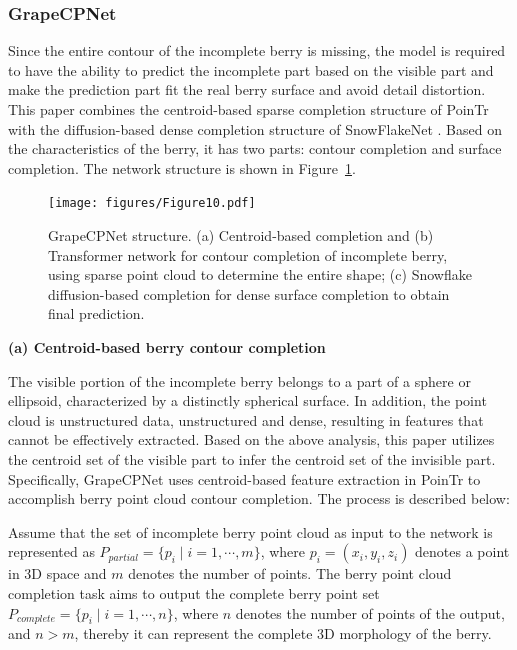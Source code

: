 \documentclass[12pt]{article}
\begin{document}
\subsubsection{GrapeCPNet}

Since the entire contour of the incomplete berry is missing, the model is required to have the ability to predict the incomplete part based on the visible part and make the prediction part fit the real berry surface and avoid detail distortion. 
This paper combines the centroid-based sparse completion structure of PoinTr \citep{yu_pointr_2021} with the diffusion-based dense completion structure of SnowFlakeNet \citep{xiang_snowflakenet_2021}. 
Based on the characteristics of the berry, it has two parts: contour completion and surface completion. The network structure is shown in Figure~\ref{fig:raw5}.

\begin{figure}[hbt!]
    \centering
    \texttt{[image: figures/Figure10.pdf]}
    \caption{GrapeCPNet structure. (a) Centroid-based completion and (b) Transformer network for contour completion of incomplete berry, using sparse point cloud to determine the entire shape; (c) Snowflake diffusion-based completion for dense surface completion to obtain final prediction.}
    \label{fig:raw5}
\end{figure}

{\raggedright\textbf{(a) Centroid-based berry contour completion}}

The visible portion of the incomplete berry belongs to a part of a sphere or ellipsoid, characterized by a distinctly spherical surface. 
In addition, the point cloud is unstructured data, unstructured and dense, resulting in features that cannot be effectively extracted. 
Based on the above analysis, this paper utilizes the centroid set of the visible part to infer the centroid set of the invisible part. 
Specifically, GrapeCPNet uses centroid-based feature extraction in PoinTr \citep{yu_pointr_2021} to accomplish berry point cloud contour completion. The process is described below: 

Assume that the set of incomplete berry point cloud as input to the network is represented as $P_{partial}=\{p_i \mid i=1, \cdots, m \}$, where $p_i=(x_i,y_i,z_i)$ denotes a point in 3D space and $m$ denotes the number of points. 
The berry point cloud completion task aims to output the complete berry point set $P_{complete}=\{p_i \mid i=1, \cdots, n\}$, where $n$ denotes the number of points of the output, and $n > m$, thereby it can represent the complete 3D morphology of the berry.
\end{document}
